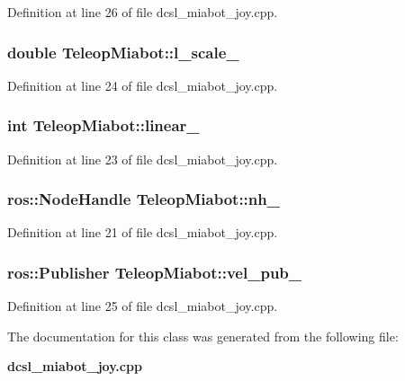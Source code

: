 \-Definition at line 26 of file dcsl\-\_\-miabot\-\_\-joy.\-cpp.

\subsubsection[{l\-\_\-scale\-\_\-}]{\setlength{\rightskip}{0pt plus 5cm}double {\bf \-Teleop\-Miabot\-::l\-\_\-scale\-\_\-}\hspace{0.3cm}{\ttfamily  [private]}}\label{classTeleopMiabot_abb2794c3238426aa421e25ca4d0b67e8}


\-Definition at line 24 of file dcsl\-\_\-miabot\-\_\-joy.\-cpp.

\subsubsection[{linear\-\_\-}]{\setlength{\rightskip}{0pt plus 5cm}int {\bf \-Teleop\-Miabot\-::linear\-\_\-}\hspace{0.3cm}{\ttfamily  [private]}}\label{classTeleopMiabot_a6d56438d8a98fde9616d7a037e3c8acb}


\-Definition at line 23 of file dcsl\-\_\-miabot\-\_\-joy.\-cpp.

\subsubsection[{nh\-\_\-}]{\setlength{\rightskip}{0pt plus 5cm}ros\-::\-Node\-Handle {\bf \-Teleop\-Miabot\-::nh\-\_\-}\hspace{0.3cm}{\ttfamily  [private]}}\label{classTeleopMiabot_ad4260ca36437e55ce6ddc61c4396f05e}


\-Definition at line 21 of file dcsl\-\_\-miabot\-\_\-joy.\-cpp.

\subsubsection[{vel\-\_\-pub\-\_\-}]{\setlength{\rightskip}{0pt plus 5cm}ros\-::\-Publisher {\bf \-Teleop\-Miabot\-::vel\-\_\-pub\-\_\-}\hspace{0.3cm}{\ttfamily  [private]}}\label{classTeleopMiabot_adb7abb9d4c221e4ca527c0aec131fd34}


\-Definition at line 25 of file dcsl\-\_\-miabot\-\_\-joy.\-cpp.



\-The documentation for this class was generated from the following file\-:\begin{DoxyCompactItemize}
\item 
{\bf dcsl\-\_\-miabot\-\_\-joy.\-cpp}\end{DoxyCompactItemize}

